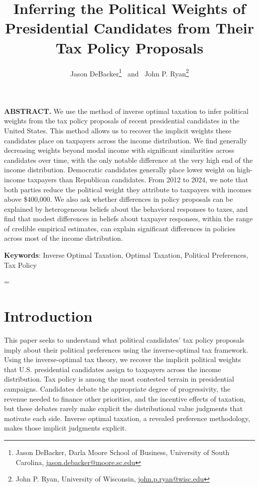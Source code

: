 \documentclass[12pt]{article}
\title{\renewcommand{\baselinestretch}{1.17}\bf
{Inferring the Political Weights of Presidential Candidates from Their Tax Policy Proposals}
}
\author{
Jason DeBacker\thanks{Jason DeBacker, Darla Moore School of Business, University of South Carolina,  \href{mailto:jason.debacker@moore.sc.edu}{jason.debacker@moore.sc.edu}} \ and \ John P. Ryan\thanks{John P. Ryan, University of Wisconsin,  \href{mailto:john.p.ryan@wisc.edu}{john.p.ryan@wisc.edu}}
}
\begin{document}
\date{}

\maketitle

\vspace{-0.5cm}


\bigskip
\noindent
{\small{\bf ABSTRACT.}
We use the method of inverse optimal taxation to infer political weights from the tax policy proposals of recent presidential candidates in the United States.  This method allows us to recover the implicit weights these candidates place on taxpayers across the income distribution. We find generally decreasing weights beyond modal income with significant similarities across candidates over time, with the only notable difference at the very high end of the income distribution. Democratic candidates generally place lower weight on high-income taxpayers than Republican candidates. From 2012 to 2024, we note that both parties reduce the political weight they attribute to taxpayers with incomes above \$400,000. We also ask whether differences in policy proposals can be explained by heterogeneous beliefs about the behavioral responses to taxes, and find that modest differences in beliefs about taxpayer responses, within the range of credible empirical estimates, can explain significant differences in policies across most of the income distribution.
}

\medskip
\noindent
{\small{\bf Keywords}{:}
Inverse Optimal Taxation, Optimal Taxation, Political Preferences, Tax Policy
}

\baselineskip=\normalbaselineskip

\section{Introduction}\label{sec:1}

This paper seeks to understand what political candidates' tax policy proposals imply about their political preferences using the inverse-optimal tax framework. Using the inverse-optimal tax theory, we recover the implicit political weights that U.S. presidential candidates assign to taxpayers across the income distribution. Tax policy is among the most contested terrain in presidential campaigns. Candidates debate the appropriate degree of progressivity, the revenue needed to finance other priorities, and the incentive effects of taxation, but these debates rarely make explicit the distributional value judgments that motivate each side. Inverse optimal taxation, a revealed preference methodology, makes those implicit judgments explicit.
\end{document}
